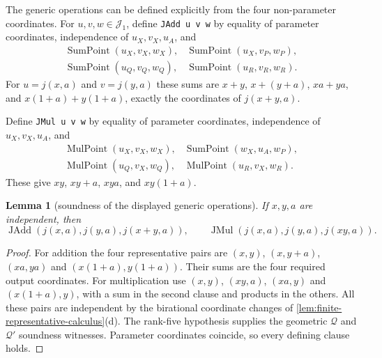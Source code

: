 \documentclass[11pt,oneside]{article}
\newtheorem{lemma}[theorem]{Lemma}
\theoremstyle{definition}
\theoremstyle{remark}
\newcommand{\Qrel}{\mathcal{Q}}
\newcommand{\Qprel}{\mathcal{Q}'}
\newcommand{\Jrel}{\mathcal{J}}
\newcommand{\lean}[1]{\nolinkurl{#1}}
\begin{document}
The generic operations can be defined explicitly from the four non-parameter coordinates.
For $u,v,w\in\Jrel_1$, define \lean{JAdd u v w} by equality of parameter coordinates,
independence of $u_X,v_X,u_A$, and
\[
\begin{array}{ll}
\operatorname{SumPoint}(u_X,v_X,w_X),&
\operatorname{SumPoint}(u_X,v_P,w_P),\\
\operatorname{SumPoint}(u_Q,v_Q,w_Q),&
\operatorname{SumPoint}(u_R,v_R,w_R).
\end{array}
\]
For $u=j(x,a)$ and $v=j(y,a)$ these sums are
$x+y$, $x+(y+a)$, $xa+ya$, and $x(1+a)+y(1+a)$, exactly the coordinates of
$j(x+y,a)$.

Define \lean{JMul u v w} by equality of parameter coordinates, independence of
$u_X,v_X,u_A$, and
\[
\begin{array}{ll}
\operatorname{MulPoint}(u_X,v_X,w_X),&
\operatorname{SumPoint}(w_X,u_A,w_P),\\
\operatorname{MulPoint}(u_Q,v_X,w_Q),&
\operatorname{MulPoint}(u_R,v_X,w_R).
\end{array}
\]
These give $xy$, $xy+a$, $xya$, and $xy(1+a)$.

\begin{lemma}[soundness of the displayed generic operations]\label{lem:generic-arithmetic}
If $x,y,a$ are independent, then
\[
 \operatorname{JAdd}(j(x,a),j(y,a),j(x+y,a)),\qquad
 \operatorname{JMul}(j(x,a),j(y,a),j(xy,a)).
\]
\end{lemma}
\begin{proof}
For addition the four representative pairs are $(x,y)$, $(x,y+a)$, $(xa,ya)$ and
$(x(1+a),y(1+a))$. Their sums are the four required output coordinates. For
multiplication use $(x,y)$, $(xy,a)$, $(xa,y)$ and $(x(1+a),y)$, with a sum in the second
clause and products in the others. All these pairs are independent by the birational
coordinate changes of \cref{lem:finite-representative-calculus}(d). The rank-five
hypothesis supplies the geometric $\Qrel$ and $\Qprel$ soundness witnesses. Parameter
coordinates coincide, so every defining clause holds.
\end{proof}
\end{document}
